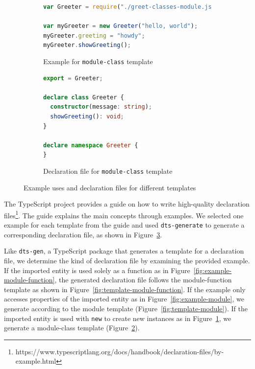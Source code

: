 \documentclass[english,cleveref,autoref,submission]{programming}
\newcommand{\figref}[1]{Figure~\ref{#1}}
\begin{document}
\begin{figure}[tp]
    \begin{subfigure}{0.48\linewidth}
      \begin{lstlisting}[language=JavaScript,numbers=none]
var Greeter = require("./greet-classes-module.js");

var myGreeter = new Greeter("hello, world");
myGreeter.greeting = "howdy";
myGreeter.showGreeting();
      \end{lstlisting}
      \caption{Example for \texttt{module-class} template}
      \label{fig:example-class}
    \end{subfigure}
    \hfill
    \begin{subfigure}{0.48\linewidth}
      \begin{lstlisting}[language=TypeScript,numbers=none]
export = Greeter;

declare class Greeter {
  constructor(message: string);
  showGreeting(): void;
}

declare namespace Greeter {
}
      \end{lstlisting}
      \caption{Declaration file for \texttt{module-class} template}
      \label{fig:template-class}
    \end{subfigure}

  \caption{Example uses and declaration files for different templates}
  \label{fig:typescript-templates-by-example}
\end{figure}
 
The TypeScript project provides a guide on how to write high-quality declaration
files\footnote{https://www.typescriptlang.org/docs/handbook/declaration-files/by-example.html}. The guide
explains the main concepts through examples. We selected one example for each template
from the guide and
used \texttt{dts-generate} to generate a corresponding declaration file, as shown in
\figref{fig:typescript-templates-by-example}.

Like \texttt{dts-gen}, a TypeScript package that generates a template for a declaration
file, we determine the kind of declaration file by examining the provided example. If the
imported entity is used solely as a function as in Figure~\ref{fig:example-module-function}, the
generated declaration file follows the module-function template as shown in Figure~\ref{fig:template-module-function}.
If the example only accesses properties of the imported entity as in
Figure~\ref{fig:example-module}, we generate according to the module template (Figure~\ref{fig:template-module}).
If the imported entity is used with \lstinline/new/ to create new instances as in
Figure~\ref{fig:example-class}, we generate a module-class template (Figure~\ref{fig:template-class}).
\end{document}
